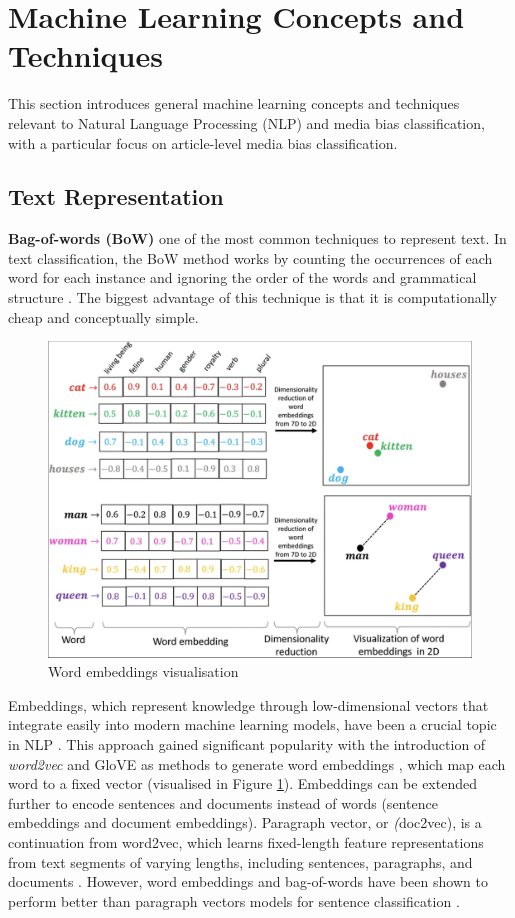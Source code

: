 \section{Machine Learning Concepts and Techniques}

This section introduces general machine learning concepts and techniques relevant to Natural Language Processing (NLP) and media bias classification, with a particular focus on article-level media bias classification.

\subsection{Text Representation}

\textbf{Bag-of-words (BoW)} one of the most common techniques to represent text. In text classification, the BoW method works by counting the occurrences of each word for each instance and ignoring the order of the words and grammatical structure \cite{qader-2019-bow}. The biggest advantage of this technique is that it is computationally cheap and conceptually simple.

\begin{figure}[htbp]
    \centering
    \includegraphics[width=0.8\linewidth]{images/word_embeddings.png}
    \caption{Word embeddings visualisation \cite{narayanan-2019-word-embeddings}}
    \label{fig:word-embeddings}
\end{figure}

Embeddings, which represent knowledge through low-dimensional vectors that integrate easily into modern machine learning models, have been a crucial topic in NLP \cite{camacho-collados-2020-embeddings}. This approach gained significant popularity with the introduction of \textit{word2vec} and GloVE \cite{pennington-2014-glove} as methods to generate word embeddings \cite{mikolov-2013-embeddings}, which map each word to a fixed vector (visualised in Figure \ref{fig:word-embeddings}). Embeddings can be extended further to encode sentences and documents instead of words (sentence embeddings and document embeddings). Paragraph vector, or \textit(doc2vec), is a continuation from word2vec, which learns fixed-length feature representations from text segments of varying lengths, including sentences, paragraphs, and documents \cite{mikolov-2014-doc2vec}. However, word embeddings and bag-of-words have been shown to perform better than paragraph vectors models for sentence classification \cite{white-2015-how-well-sentence-embeddings}.

